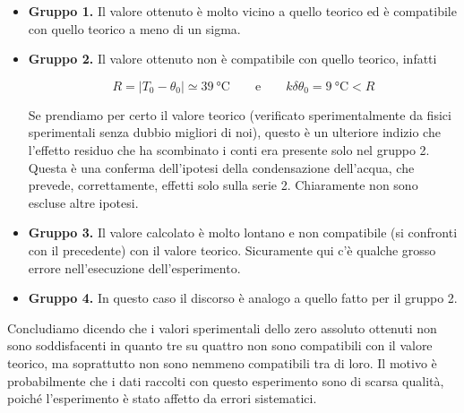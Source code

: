 \begin{itemize}
    \item{\textbf{Gruppo 1.} Il valore ottenuto è molto vicino a quello teorico ed è compatibile con quello teorico
        a meno di un sigma.}

    \item{\textbf{Gruppo 2.} Il valore ottenuto non è compatibile con quello teorico, infatti
        
        \begin{equation}
            R = |T_0 - \theta_0| \simeq \SI{39}{\celsius} \qquad \text{e} \qquad k\delta \theta_0 = \SI{9}{\celsius} < R
        \end{equation}

        Se prendiamo per certo il valore teorico (verificato sperimentalmente da fisici sperimentali senza dubbio migliori
        di noi), questo è un ulteriore indizio che l'effetto residuo che ha scombinato i conti era presente solo nel gruppo 2.
        Questa è una conferma dell'ipotesi della condensazione dell'acqua, che prevede, correttamente, effetti solo sulla serie 2.
        Chiaramente non sono escluse altre ipotesi.}

    \item{\textbf{Gruppo 3.} Il valore calcolato è molto lontano e non compatibile (si confronti con il precedente) con il valore
        teorico. Sicuramente qui c'è qualche grosso errore nell'esecuzione dell'esperimento.}
    
    \item{\textbf{Gruppo 4.} In questo caso il discorso è analogo a quello fatto per il gruppo 2.}
\end{itemize}

Concludiamo dicendo che i valori sperimentali dello zero assoluto ottenuti non sono soddisfacenti in quanto tre su quattro
non sono compatibili con il valore teorico, ma soprattutto non sono nemmeno compatibili tra di loro. Il motivo è probabilmente che i dati raccolti con questo esperimento sono di scarsa qualità, poiché l'esperimento è stato affetto da errori sistematici.
